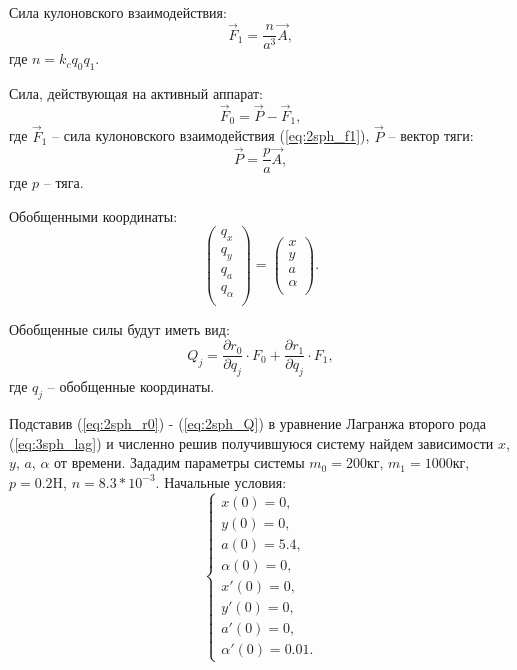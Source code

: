 Сила кулоновского взаимодействия:
\begin{equation}
\label{eq:2sph_f1}
	\vec{F}_1 = \frac{n}{a^3}\vec{A},
\end{equation}
где $n = k_c q_0 q_1$.

Сила, действующая на активный аппарат:
\begin{equation}
\label{eq:2sph_f0}
	\vec{F}_0 = \vec{P} - \vec{F}_1,
\end{equation}
где $\vec{F}_1$ – сила кулоновского взаимодействия (\ref{eq:2sph_f1}), $\vec{P}$ – вектор тяги:
\begin{equation}
\label{eq:2sph_P}
	\vec{P} = \frac{p}{a} \vec{A},
\end{equation}
где $p$ – тяга.

Обобщенными координаты:
\begin{equation}
\label{eq:2sph_qj}
	\begin{pmatrix}
		q_x \\
		q_y \\
		q_a \\
		q_\alpha \\
	\end{pmatrix} 
	=
	\begin{pmatrix}
		x \\
		y \\
		a \\
		\alpha \\
	\end{pmatrix}.
\end{equation}

Обобщенные силы будут иметь вид:
\begin{equation}
\label{eq:2sph_Q}
	Q_j = \frac{\partial r_0}{\partial q_j} \cdot F_0 + \frac{\partial r_1}{\partial q_j} \cdot F_1,
\end{equation}
где $q_j$ – обобщенные координаты.

Подставив (\ref{eq:2sph_r0}) - (\ref{eq:2sph_Q}) в уравнение Лагранжа второго рода (\ref{eq:3sph_lag}) и численно решив получившуюся систему найдем зависимости $x$, $y$, $a$, $\alpha$ от времени.
Зададим параметры системы $m_0 = 200$кг, $m_1=1000$кг, $p=0.2$H, $n=8.3 * 10^{-3}$.
Начальные условия:
\begin{equation}
	\begin{cases}
		x(0) = 0, \\
		y(0) = 0, \\
		a(0) = 5.4, \\
		\alpha(0) = 0,\\
		x'(0) = 0, \\
		y'(0) = 0, \\
		a'(0) = 0, \\
		\alpha'(0) = 0.01.
	\end{cases}
\end{equation}

